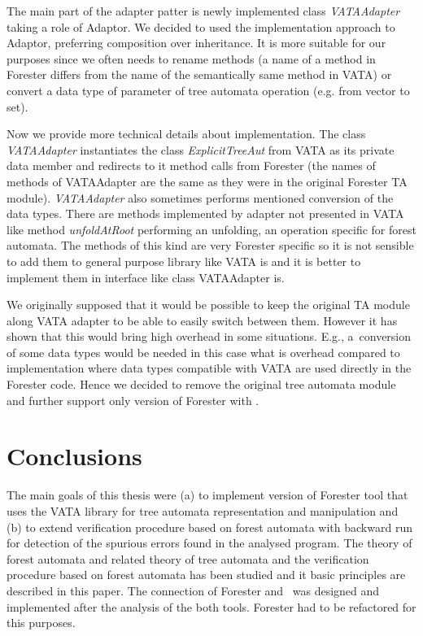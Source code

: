 \documentclass[fleqn,11pt]{ExcelAtFIT} %
\begin{document}
The main part of the adapter patter is newly implemented class \emph{VATAAdapter} taking a role of Adaptor.
We decided to used the implementation approach to Adaptor, preferring composition over inheritance.
It is more suitable for our purposes since we often needs to rename methods 
(a name of a method in Forester differs from the name of the semantically same method in VATA)
or convert a data type of parameter of tree automata operation (e.g. from vector to set). 

Now we provide more technical details about implementation.
The class \emph{VATAAdapter} instantiates the class \emph{ExplicitTreeAut} from VATA as its private data member
and redirects to it method calls from Forester (the names of methods of VATAAdapter are the same as they were
in the original Forester TA module).
\emph{VATAAdapter} also sometimes performs mentioned conversion of the data types.
There are methods implemented by adapter not presented in VATA like method \emph{unfoldAtRoot}
performing an unfolding, an operation specific for forest automata.
The methods of this kind are very Forester specific so it is not sensible to add them to general purpose library like VATA is
and it is better to implement them in interface like class VATAAdapter is.

We originally supposed that it would be possible to keep the original TA module along VATA adapter
to be able to easily switch between them.
However it has shown that this would bring high overhead in some situations.
E.g., a~conversion of some data types would be needed in this case
what is overhead compared to implementation where data types compatible with VATA are used directly in the Forester code.
Hence we decided to remove the original tree automata module and further support only version of Forester with \vata.

\section{Conclusions}
\label{sec:concl}

The main goals of this thesis were (a) to implement version of Forester tool that uses the VATA library for tree automata representation and manipulation
and (b) to extend verification procedure based on forest automata with backward run for detection of the spurious errors found in the analysed program.
The theory of forest automata and related theory of tree automata and the verification procedure based on forest automata has been studied
and it basic principles are described in this paper.
The connection of Forester and \vata\ was designed and implemented after the analysis of the both tools.
Forester had to be refactored for this purposes.
\end{document}
